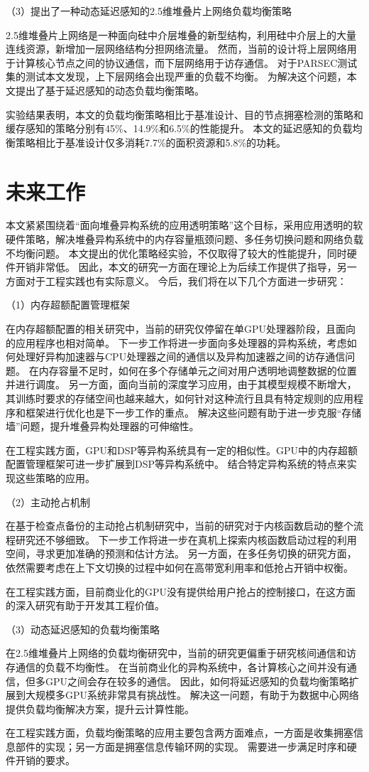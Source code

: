 （3）提出了一种动态延迟感知的2.5维堆叠片上网络负载均衡策略

2.5维堆叠片上网络是一种面向硅中介层堆叠的新型结构，利用硅中介层上的大量连线资源，新增加一层网络结构分担网络流量。
然而，当前的设计将上层网络用于计算核心节点之间的协议通信，而下层网络用于访存通信。
对于PARSEC测试集的测试本文发现，上下层网络会出现严重的负载不均衡。
为解决这个问题，本文提出了基于延迟感知的动态负载均衡策略。

实验结果表明，本文的负载均衡策略相比于基准设计、目的节点拥塞检测的策略和缓存感知的策略分别有45\%、14.9\%和6.5\%的性能提升。
本文的延迟感知的负载均衡策略相比于基准设计仅多消耗7.7\%的面积资源和5.8\%的功耗。



\section{未来工作}
本文紧紧围绕着``面向堆叠异构系统的应用透明策略''这个目标，采用应用透明的软硬件策略，解决堆叠异构系统中的内存容量瓶颈问题、多任务切换问题和网络负载不均衡问题。
本文提出的优化策略经实验，不仅取得了较大的性能提升，同时硬件开销非常低。
因此，本文的研究一方面在理论上为后续工作提供了指导，另一方面对于工程实践也有实际意义。
今后，我们将在以下几个方面进一步研究：

（1）内存超额配置管理框架

在内存超额配置的相关研究中，当前的研究仅停留在单GPU处理器阶段，且面向的应用程序也相对简单。
下一步工作将进一步面向多处理器的异构系统，考虑如何处理好异构加速器与CPU处理器之间的通信以及异构加速器之间的访存通信问题。
在内存容量不足时，如何在多个存储单元之间对用户透明地调整数据的位置并进行调度。
另一方面，面向当前的深度学习应用，由于其模型规模不断增大，其训练时要求的存储空间也越来越大，如何针对这种流行且具有特定规则的应用程序和框架进行优化也是下一步工作的重点。
解决这些问题有助于进一步克服``存储墙''问题，提升堆叠异构处理器的可伸缩性。

在工程实践方面，GPU和DSP等异构系统具有一定的相似性。GPU中的内存超额配置管理框架可进一步扩展到DSP等异构系统中。
结合特定异构系统的特点来实现这些策略的应用。


（2）主动抢占机制

在基于检查点备份的主动抢占机制研究中，当前的研究对于内核函数启动的整个流程研究还不够细致。
下一步工作将进一步在真机上探索内核函数启动过程的利用空间，寻求更加准确的预测和估计方法。
另一方面，在多任务切换的研究方面，依然需要考虑在上下文切换的过程中如何在高带宽利用率和低抢占开销中权衡。

在工程实践方面，目前商业化的GPU没有提供给用户抢占的控制接口，在这方面的深入研究有助于开发其工程价值。

（3）动态延迟感知的负载均衡策略

在2.5维堆叠片上网络的负载均衡研究中，当前的研究更偏重于研究核间通信和访存通信的负载不均衡性。
在当前商业化的异构系统中，各计算核心之间并没有通信，但多GPU之间会存在较多的通信。
因此，如何将延迟感知的负载均衡策略扩展到大规模多GPU系统非常具有挑战性。
解决这一问题，有助于为数据中心网络提供负载均衡解决方案，提升云计算性能。

在工程实践方面，负载均衡策略的应用主要包含两方面难点，一方面是收集拥塞信息部件的实现；另一方面是拥塞信息传输环网的实现。
需要进一步满足时序和硬件开销的要求。





